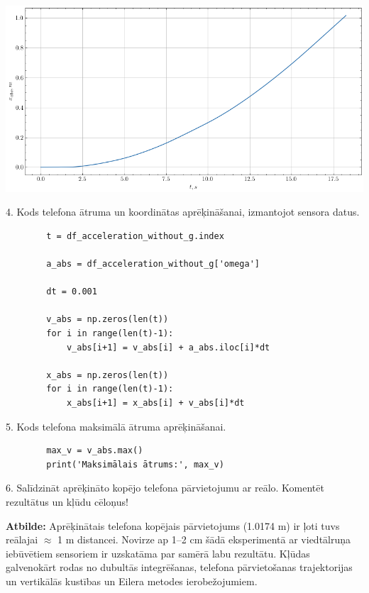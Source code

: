 \documentclass[12pt]{article}
\newlength\tindent
\renewcommand{\indent}{\hspace*{\tindent}}
\begin{document}
\begin{center}
    \includegraphics[width=1\textwidth]{Telefona pārvietojuma noteikšana3.png}
\end{center}

4.	Kods telefona ātruma un koordinātas aprēķināšanai, izmantojot sensora datus.

\begin{center}
    \begin{verbatim}
        t = df_acceleration_without_g.index
        
        a_abs = df_acceleration_without_g['omega']
        
        dt = 0.001
        
        v_abs = np.zeros(len(t))
        for i in range(len(t)-1):
            v_abs[i+1] = v_abs[i] + a_abs.iloc[i]*dt
        
        x_abs = np.zeros(len(t))
        for i in range(len(t)-1):
            x_abs[i+1] = x_abs[i] + v_abs[i]*dt
    \end{verbatim}
\end{center}

5.	Kods telefona maksimālā ātruma aprēķināšanai.

\begin{center}
    \begin{verbatim}
        max_v = v_abs.max()
        print('Maksimālais ātrums:', max_v)
    \end{verbatim}  
\end{center}

6.	Salīdzināt aprēķināto kopējo telefona pārvietojumu ar reālo. Komentēt rezultātus un kļūdu cēloņus!

\indent \textbf{Atbilde:} Aprēķinātais telefona kopējais pārvietojums (1.0174 m) ir ļoti tuvs reālajai $\approx$ 1 m distancei. Novirze ap 1–2 cm šādā eksperimentā ar viedtālruņa iebūvētiem sensoriem ir uzskatāma par samērā labu rezultātu. Kļūdas galvenokārt rodas no dubultās integrēšanas, telefona pārvietošanas trajektorijas un vertikālās kustības un Eilera metodes ierobežojumiem.
\end{document}
